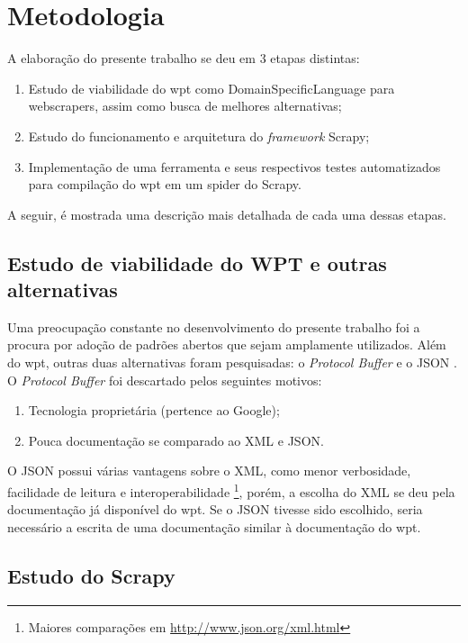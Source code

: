 \chapter{Metodologia}
\thispagestyle{fancy}

A elaboração do presente trabalho se deu em 3 etapas distintas:

\begin{enumerate}
	\item Estudo de viabilidade do \gls{wpt} como \gls{DomainSpecificLanguage} para \glspl{webscraper}, assim como busca de melhores alternativas;
	\item Estudo do funcionamento e arquitetura do \textit{framework} Scrapy;
	\item Implementação de uma ferramenta e seus respectivos testes automatizados para compilação do \gls{wpt} em um \gls{spider} do Scrapy.
\end{enumerate}

A seguir, é mostrada uma descrição mais detalhada de cada uma dessas etapas.

\section{Estudo de viabilidade do WPT e outras alternativas}

Uma preocupação constante no desenvolvimento do presente trabalho foi a procura por adoção de padrões abertos que sejam amplamente utilizados. Além do \gls{wpt}, outras duas alternativas foram pesquisadas: o \textit{Protocol Buffer} \cite{protobuf} e o JSON \cite{JSON}. O \emph{Protocol Buffer} foi descartado pelos seguintes motivos:

\begin{enumerate}
	\item Tecnologia proprietária (pertence ao Google);
	\item Pouca documentação se comparado ao XML e JSON.
\end{enumerate}

O JSON possui várias vantagens sobre o XML, como menor verbosidade, facilidade de leitura e interoperabilidade \footnote{Maiores comparações em \url{http://www.json.org/xml.html}}, porém, a escolha do XML se deu pela documentação já disponível do \gls{wpt}. Se o JSON tivesse sido escolhido, seria necessário a escrita de uma documentação similar à documentação do \gls{wpt}.

\section{Estudo do Scrapy}

